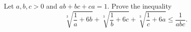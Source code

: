 Let $a, b, c > 0$ and $ab + bc + ca = 1$. Prove the inequality
\[ \sqrt[3]{\frac{1}{a} + 6b} + \sqrt[3]{\frac{1}{b} + 6c} + \sqrt[3]{\frac{1}{c} + 6a} \leq \frac{1}{abc}. \]
